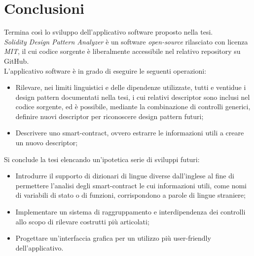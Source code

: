 \chapter{Conclusioni}
Termina così lo sviluppo dell'applicativo software proposto nella tesi.\\
\newline
\textit{Solidity Design Pattern Analyzer} è un software \textit{open-source} rilasciato con licenza \textit{MIT}, il cui codice sorgente è liberalmente accessibile nel relativo repository su GitHub\cite{github-repo}.\\
\newline
L'applicativo software è in grado di eseguire le seguenti operazioni:
\begin{itemize}
	\item Rilevare, nei limiti linguistici e delle dipendenze utilizzate, tutti e ventidue i design pattern documentati nella tesi, i cui relativi descriptor sono inclusi nel codice sorgente, ed è possibile, mediante la combinazione di controlli generici, definire nuovi descriptor per riconoscere design pattern futuri;
	\item Descrivere uno smart-contract, ovvero estrarre le informazioni utili a creare un nuovo descriptor;
\end{itemize} 
Si conclude la tesi elencando un'ipotetica serie di sviluppi futuri:
\begin{itemize}
	\item Introdurre il supporto di dizionari di lingue diverse dall'inglese al fine di permettere l'analisi degli smart-contract le cui informazioni utili, come nomi di variabili di stato o di funzioni, corrispondono a parole di lingue straniere;
	\item Implementare un sistema di raggruppamento e interdipendenza dei controlli allo scopo di rilevare costrutti più articolati;
	\item Progettare un'interfaccia grafica per un utilizzo più user-friendly dell'applicativo.
\end{itemize}
 
 